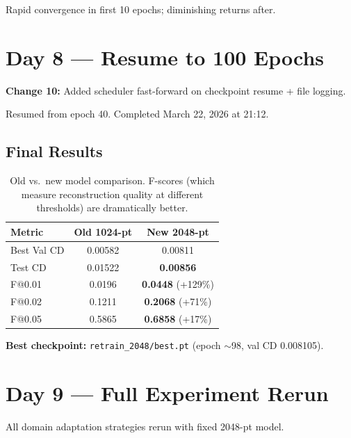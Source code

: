 \documentclass[10pt,twocolumn,letterpaper]{article}
\begin{document}
Rapid convergence in first 10 epochs; diminishing returns after.

\section{Day 8 --- Resume to 100 Epochs}

\textbf{Change 10:} Added scheduler fast-forward on checkpoint resume + file logging.

Resumed from epoch 40. Completed March 22, 2026 at 21:12.

\subsection{Final Results}

\begin{table}[h]
\centering
\scriptsize
\begin{tabular}{@{}lcc@{}}
\toprule
\textbf{Metric} & \textbf{Old 1024-pt} & \textbf{New 2048-pt} \\
\midrule
Best Val CD & 0.00582 & 0.00811 \\
Test CD & 0.01522 & \textbf{0.00856} \\
F@0.01 & 0.0196 & \textbf{0.0448} (+129\%) \\
F@0.02 & 0.1211 & \textbf{0.2068} (+71\%) \\
F@0.05 & 0.5865 & \textbf{0.6858} (+17\%) \\
\bottomrule
\end{tabular}
\caption{Old vs.\ new model comparison. F-scores (which measure reconstruction quality at different thresholds) are dramatically better.}
\end{table}

\textbf{Best checkpoint:} \texttt{retrain\_2048/best.pt} (epoch $\sim$98, val CD 0.008105).

\section{Day 9 --- Full Experiment Rerun}

All domain adaptation strategies rerun with fixed 2048-pt model.
\end{document}
